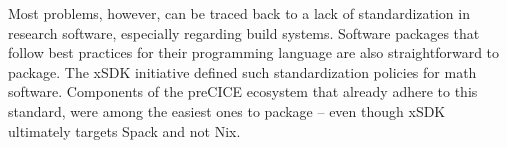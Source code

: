 \documentclass{eceasst}
\begin{document}
Most problems, however, can be traced back to a lack of standardization in research software, especially regarding build systems.
Software packages that follow best practices for their programming language are also straightforward to package.
The xSDK initiative defined such standardization policies for math software. Components of the preCICE ecosystem that already adhere to this standard, were among the easiest ones to package -- even though xSDK  ultimately targets Spack and not Nix.





\end{document}

